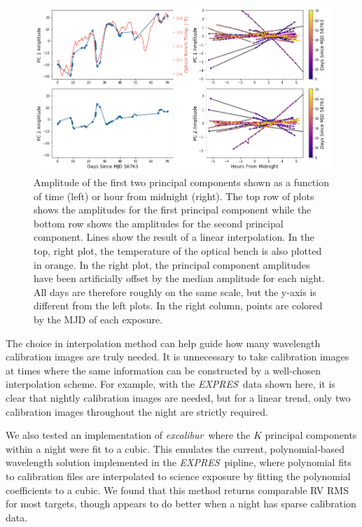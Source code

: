 \documentclass[modern]{aastex63}
\newcommand{\project}[1]{\textsl{#1}}
\newcommand{\name}{\project{excalibur}}
\newcommand{\acronym}[1]{{\small{#1}}}
\newcommand{\expres}{\project{\acronym{EXPRES}}}
\begin{document}
\begin{figure}[t]
\centering
\includegraphics[width=\textwidth]{Figures/pcAs_byDay.png}
\caption{Amplitude of the first two principal components shown as a function of time (left) or hour from midnight (right).  The top row of plots shows the amplitudes for the first principal component while the bottom row shows the amplitudes for the second principal component.  Lines show the result of a linear interpolation.  In the top, right plot, the temperature of the optical bench is also plotted in orange.  In the right plot, the principal component amplitudes have been artificially offset by the median amplitude for each night.  All days are therefore roughly on the same scale, but the y-axis is different from the left plots.  In the right column, points are colored by the MJD of each exposure.}
\label{fig:nightlyVariation}
\end{figure} 

The choice in interpolation method can help guide how many wavelength calibration images are truly needed.  It is unnecessary to take calibration images at times where the same information can be constructed by a well-chosen interpolation scheme.  For example, with the \expres\ data shown here, it is clear that nightly calibration images are needed, but for a linear trend, only two calibration images throughout the night are strictly required.

We also tested an implementation of \name\ where the $K$ principal components within a night were fit to a cubic.  This emulates the current, polynomial-based wavelength solution implemented in the \expres\ pipline, where polynomial fits to calibration files are interpolated to science exposure by fitting the polynomial coefficients to a cubic.  We found that this method returns comparable RV RMS for most targets, though appears to do better when a night has sparse calibration data.
\end{document}
